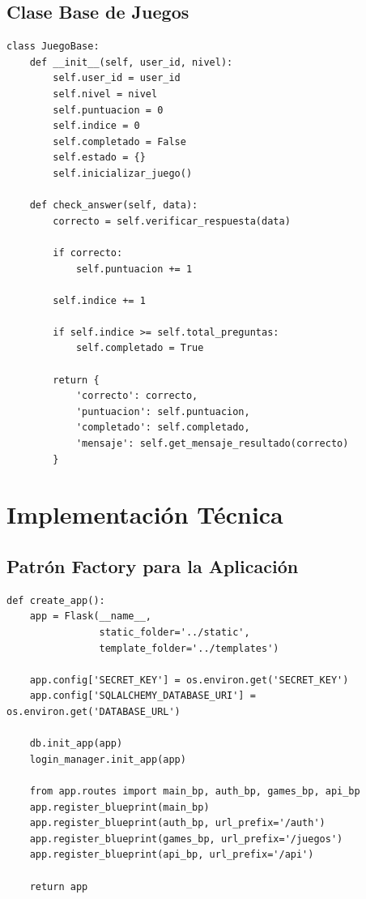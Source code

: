 \documentclass[12pt,a4paper]{article}
\begin{document}
\subsection{Clase Base de Juegos}

\begin{lstlisting}[caption=Clase base JuegoBase para todos los juegos]
class JuegoBase:
    def __init__(self, user_id, nivel):
        self.user_id = user_id
        self.nivel = nivel
        self.puntuacion = 0
        self.indice = 0
        self.completado = False
        self.estado = {}
        self.inicializar_juego()
    
    def check_answer(self, data):
        correcto = self.verificar_respuesta(data)
        
        if correcto:
            self.puntuacion += 1
        
        self.indice += 1
        
        if self.indice >= self.total_preguntas:
            self.completado = True
        
        return {
            'correcto': correcto,
            'puntuacion': self.puntuacion,
            'completado': self.completado,
            'mensaje': self.get_mensaje_resultado(correcto)
        }
\end{lstlisting}

\section{Implementación Técnica}

\subsection{Patrón Factory para la Aplicación}

\begin{lstlisting}[caption=Factory pattern para crear la aplicación Flask]
def create_app():
    app = Flask(__name__, 
                static_folder='../static',
                template_folder='../templates')
    
    app.config['SECRET_KEY'] = os.environ.get('SECRET_KEY')
    app.config['SQLALCHEMY_DATABASE_URI'] = os.environ.get('DATABASE_URL')
    
    db.init_app(app)
    login_manager.init_app(app)
    
    from app.routes import main_bp, auth_bp, games_bp, api_bp
    app.register_blueprint(main_bp)
    app.register_blueprint(auth_bp, url_prefix='/auth')
    app.register_blueprint(games_bp, url_prefix='/juegos')
    app.register_blueprint(api_bp, url_prefix='/api')
    
    return app
\end{lstlisting}
\end{document}
